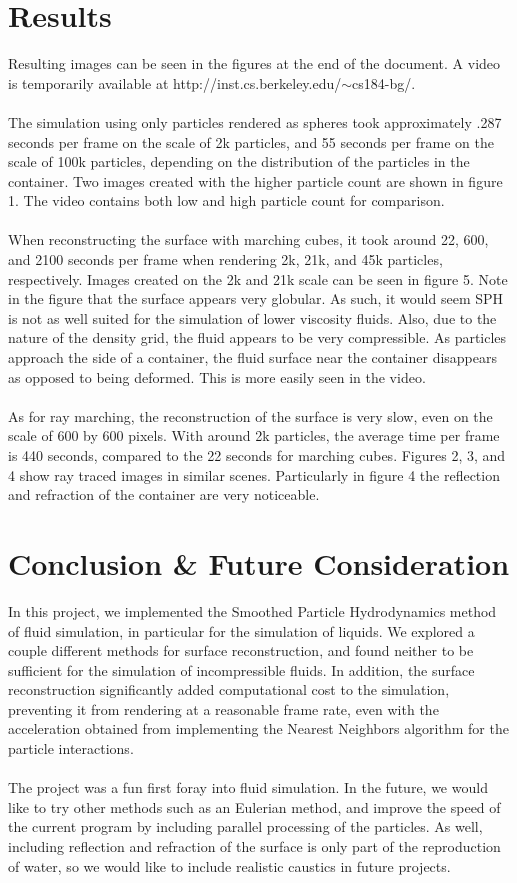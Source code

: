 \documentclass[11pt]{article}
\begin{document}
\section*{Results}
Resulting images can be seen in the figures at the end of the document.  A video is temporarily available at http://inst.cs.berkeley.edu/$\sim$cs184-bg/.
\\ \\
The simulation using only particles rendered as spheres took approximately .287 seconds per frame on the scale of 2k particles, and 55 seconds per frame on the scale of 100k particles, depending on the distribution of the particles in the container. Two images created with the higher particle count are shown in figure 1. The video contains both low and high particle count for comparison. 
\\ \\
When reconstructing the surface with marching cubes, it took around 22, 600, and 2100 seconds per frame when rendering 2k, 21k, and 45k particles, respectively. Images created on the 2k and 21k scale can be seen in figure 5. Note in the figure that the surface appears very globular. As such, it would seem SPH is not as well suited for the simulation of lower viscosity fluids. Also, due to the nature of the density grid, the fluid appears to be very compressible. As particles approach the side of a container, the fluid surface near the container disappears as opposed to being deformed. This is more easily seen in the video.
\\ \\
As for ray marching, the reconstruction of the surface is very slow, even on the scale of 600 by 600 pixels. With around 2k particles, the average time per frame is 440 seconds, compared to the 22 seconds for marching cubes. Figures 2, 3, and 4 show ray traced images in similar scenes. Particularly in figure 4 the reflection and refraction of the container are very noticeable.

\section*{Conclusion \& Future Consideration}
In this project, we implemented the Smoothed Particle Hydrodynamics method of fluid simulation, in particular for the simulation of liquids. We explored a couple different methods for surface reconstruction, and found neither to be sufficient for the simulation of incompressible fluids. In addition, the surface reconstruction significantly added computational cost to the simulation, preventing it from rendering at a reasonable frame rate, even with the acceleration obtained from implementing the Nearest Neighbors algorithm for the particle interactions.
\\ \\
The project was a fun first foray into fluid simulation. In the future, we would like to try other methods such as an Eulerian method, and improve the speed of the current program by including parallel processing of the particles. As well, including reflection and refraction of the surface is only part of the reproduction of water, so we would like to include realistic caustics in future projects.
\end{document}
